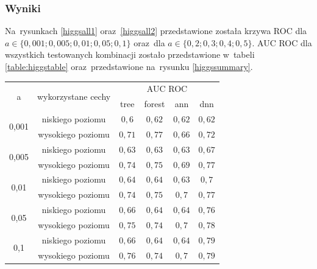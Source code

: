 \subsubsection{Wyniki}
Na~rysunkach \ref{higgsall1} oraz~\ref{higgsall2} przedstawione została krzywa ROC dla $a\in\{0,001; 0,005; 0,01; 0,05; 0,1\}$  oraz~dla $a\in\{0,2; 0,3; 0,4; 0,5\}$. AUC ROC dla wszystkich testowanych kombinacji zostało przedstawione w~tabeli \ref{table:higgstable} oraz~przedstawione na~rysunku \ref{higgssummary}.


\begin{table}[]
\centering
\begin{tabular}{|c|c|c|c|c|c|}
\hline
\multirow{2}{*}{a}                      &  \multirow{2}{*}{wykorzystane cechy} & \multicolumn{4}{c|}{AUC ROC} \\ \cline{3-6}

 &       & tree & forest & ann & dnn \\ \hline

\multirow{2}{*}{0,001} & niskiego poziomu   & $ 0,6 $ & $ 0,62 $ & $ 0,62 $ &$ 0,62 $ \\ \cline{2-6} 
                       & wysokiego poziomu & $ 0,71 $ & $ 0,77 $ & $ 0,66 $ &$ 0,72 $ \\ \hline 
                       
\multirow{2}{*}{0,005} & niskiego poziomu  & $ 0,63 $ & $ 0,63 $ & $ 0,63 $ &$ 0,67 $ \\ \cline{2-6} 
                       & wysokiego poziomu & $ 0,74 $ & $ 0,75 $ & $ 0,69 $ &$ 0,77 $ \\ \hline
                       
\multirow{2}{*}{0,01}  & niskiego poziomu  & $ 0,64 $ & $ 0,64 $ & $ 0,63 $ &$ 0,7 $ \\ \cline{2-6} 
                       & wysokiego poziomu & $ 0,74 $ & $ 0,75 $ & $ 0,7 $ &$ 0,77 $ \\ \hline
                       
\multirow{2}{*}{0,05}  & niskiego poziomu  & $ 0,66 $ & $ 0,64 $ & $ 0,64 $ &$ 0,76 $ \\ \cline{2-6} 
                       & wysokiego poziomu &  $ 0,75 $ & $ 0,74 $ & $ 0,7 $ &$ 0,78 $ \\ \hline
                       
\multirow{2}{*}{0,1}   & niskiego poziomu  &  $ 0,66 $ & $ 0,64 $ & $ 0,64 $ &$ 0,79 $ \\ \cline{2-6} 
                       & wysokiego poziomu &  $ 0,76 $ & $ 0,74 $ & $ 0,7 $ &$ 0,79 $ \\ \hline
                       

\end{tabular}
\end{table}
